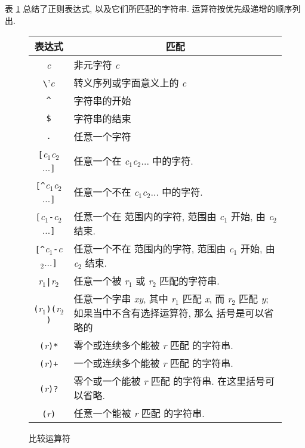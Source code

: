 表 \ref{tbl:regular_expressions} 总结了正则表达式, 以及它们所匹配的字符串.
运算符按优先级递增的顺序列出.
\begin{figure}[ht]
\captionsetup{type=table}
\caption{比较运算符}
\label{tbl:regular_expressions}
\begin{center}
\begin{tabular}{c|p{25em}}
    \hline
    \hline
    表达式  & \multicolumn{1}{c}{匹配}  \\
    \hline
    \textit{c}  & 非元字符 \textit{c}   \\
    \verb'\'\textit{c}   & 转义序列或字面意义上的 \textit{c} \\
    \verb'^'    & 字符串的开始 \\
    \verb'$'    & 字符串的结束  \\
    \verb'.'    & 任意一个字符 \\
    \verb'['\textit{c}$_1$\textit{c}$_2$...\verb']' & 任意一个在
        \textit{c}$_1$\textit{c}$_2$... 中的字符. \\
    \verb'[^'\textit{c}$_1$\textit{c}$_2$...\verb']'    & 任意一个不在
        \textit{c}$_1$\textit{c}$_2$... 中的字符. \\
    \verb'['\textit{c}$_1$\verb'-'\textit{c}$_2$...\verb']' & 任意一个在
        范围内的字符, 范围由 \textit{c}$_1$ 开始, 由 \textit{c}$_2$ 结束.
        \\
\verb'[^'\textit{c}$_1$\verb'-'\textit{c}$_2$...\verb']' & 任意一个不在
        范围内的字符, 范围由 \textit{c}$_1$ 开始,
        由 \textit{c}$_2$ 结束.  \\
    \textit{r}$_1$\verb'|'\textit{r}$_2$    & 任意一个被 \textit{r}$_1$
        或 \textit{r}$_2$ 匹配的字符串. \\
     \verb'('\textit{r}$_1$\verb')('\textit{r}$_2$\verb')'    &
         任意一个字串 \textit{xy}, 其中 \textit{r}$_1$ 匹配 \textit{x},
         而 \textit{r}$_2$ 匹配 \textit{y};
         如果当中不含有选择运算符, 那么
         括号是可以省略的 \\
     \verb'('\textit{r}\verb')*' & 零个或连续多个能被 \textit{r} 匹配
         的字符串. \\
     \verb'('\textit{r}\verb')+' & 一个或连续多个能被 \textit{r} 匹配
         的字符串. \\
     \verb'('\textit{r}\verb')?' & 零个或一个能被 \textit{r} 匹配
         的字符串. 在这里括号可以省略. \\
     \verb'('\textit{r}\verb')' & 任意一个能被 \textit{r} 匹配
         的字符串. \\
     \hline
\end{tabular}
\end{center}
\end{figure}

